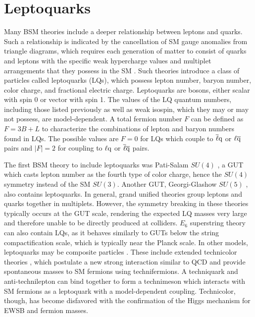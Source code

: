 \section{Leptoquarks
\label{sec:LQ}}

Many BSM theories include a deeper relationship between leptons and quarks. Such a relationship is indicated by the cancellation of SM gauge anomalies from triangle diagrams, which requires each generation of matter to consist of quarks and leptons with the specific weak hypercharge values and multiplet arrangements that they possess in the SM \cite{Peskin}. Such theories introduce a class of particles called leptoquarks (LQs), which possess lepton number, baryon number, color charge, and fractional electric charge. Leptoquarks are bosons, either scalar with spin 0 or vector with spin 1. The values of the LQ quantum numbers, including those listed previously as well as weak isospin, which they may or may not possess, are model-dependent. A total fermion number $F$ can be defined as $F = 3B + L$ to characterize the combinations of lepton and baryon numbers found in LQs. The possible values are $F=0$ for LQs which couple to $\overline{\ell}\mathrm{q}$ or $\ell\overline{\mathrm{q}}$ pairs and $|F|=2$ for coupling to $\ell\mathrm{q}$ or $\overline{\ell}\overline{\mathrm{q}}$ pairs.

The first BSM theory to include leptoquarks was Pati-Salam $SU(4)$ \cite{SU4}, a GUT which casts lepton number as the fourth type of color charge, hence the $SU(4)$ symmetry instead of the SM $SU(3)$. Another GUT, Georgi-Glashow $SU(5)$ \cite{GUT}, also contains leptoquarks. In general, grand unified theories group leptons and quarks together in multiplets. However, the symmetry breaking in these theories typically occurs at the GUT scale, rendering the expected LQ masses very large and therefore unable to be directly produced at colliders. $E_6$ superstring theory \cite{SUPERSTR} can also contain LQs, as it behaves similarly to GUTs below the string compactification scale, which is typically near the Planck scale. In other models, leptoquarks may be composite particles \cite{LQ3b}. These include extended technicolor theories \cite{TC3}, which postulate a new strong interaction similar to QCD and provide spontaneous masses to SM fermions using technifermions. A techniquark and anti-technilepton can bind together to form a technimeson which interacts with SM fermions as a leptoquark with a model-dependent coupling. Technicolor, though, has become disfavored with the confirmation of the Higgs mechanism for EWSB and fermion masses.

